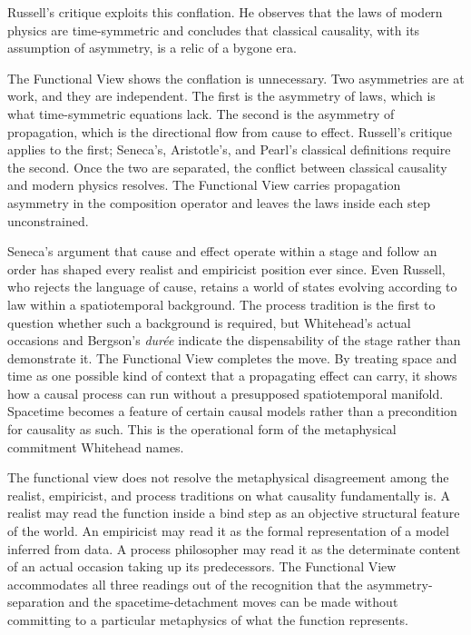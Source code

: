 Russell's critique exploits this conflation. He observes that the laws of modern physics are time-symmetric and concludes that classical causality, with its assumption of asymmetry, is a relic of a bygone era.
 
The Functional View shows the conflation is unnecessary. Two asymmetries are at work, and they are independent. The first is the asymmetry of laws, which is what time-symmetric equations lack. The second is the asymmetry of propagation, which is the directional flow from cause to effect. Russell's critique applies to the first; Seneca's, Aristotle's, and Pearl's classical definitions require the second. Once the two are separated, the conflict between classical causality and modern physics resolves. The Functional View carries propagation asymmetry in the composition operator and leaves the laws inside each step unconstrained.
  
Seneca's argument that cause and effect operate within a stage and follow an order has shaped every realist and empiricist position ever since. Even Russell, who rejects the language of cause, retains a world of states evolving according to law within a spatiotemporal background. The process tradition is the first to question whether such a background is required, but Whitehead's actual occasions and Bergson's \emph{durée} indicate the dispensability of the stage rather than demonstrate it. The Functional View completes the move. By treating space and time as one possible kind of context that a propagating effect can carry, it shows how a causal process can run without a presupposed spatiotemporal manifold. Spacetime becomes a feature of certain causal models rather than a precondition for causality as such. This is the operational form of the metaphysical commitment Whitehead names.

The functional view does not resolve the metaphysical disagreement among the realist, empiricist, and process traditions on what causality fundamentally is. A realist may read the function inside a bind step as an objective structural feature of the world. An empiricist may read it as the formal representation of a model inferred from data. A process philosopher may read it as the determinate content of an actual occasion taking up its predecessors. The Functional View accommodates all three readings out of the recognition that the asymmetry-separation and the spacetime-detachment moves can be made without committing to a particular metaphysics of what the function represents.  

\newpage